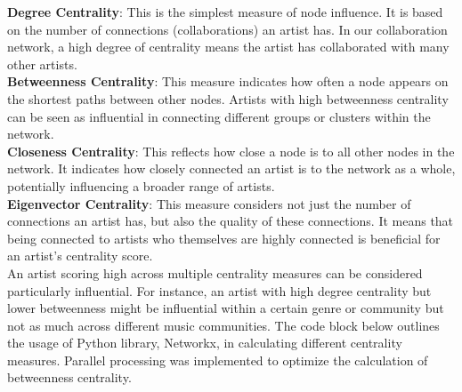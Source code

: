 \documentclass[12pt,a4paper]{article}
\begin{document}
\textbf{Degree Centrality}: This is the simplest measure of node influence. It is based on the number of connections (collaborations) an artist has. In our collaboration network, a high degree of centrality means the artist has collaborated with many other artists.\\

\textbf{Betweenness Centrality}: This measure indicates how often a node appears on the shortest paths between other nodes. Artists with high betweenness centrality can be seen as influential in connecting different groups or clusters within the network.\\

\textbf{Closeness Centrality}: This reflects how close a node is to all other nodes in the network. It indicates how closely connected an artist is to the network as a whole, potentially influencing a broader range of artists.\\

\textbf{Eigenvector Centrality}: This measure considers not just the number of connections an artist has, but also the quality of these connections. It means that being connected to artists who themselves are highly connected is beneficial for an artist’s centrality score.\\

An artist scoring high across multiple centrality measures can be considered particularly influential.  For instance, an artist with high degree centrality but lower betweenness might be influential within a certain genre or community but not as much across different music communities. The code block below outlines the usage of Python library, Networkx, in calculating different centrality measures. Parallel processing was implemented to optimize the calculation of betweenness centrality.\\
\end{document}

